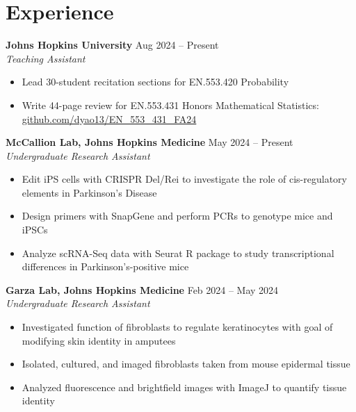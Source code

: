 \documentclass[11pt]{article}       %
\begin{document}
\vspace{-9pt}

\section*{Experience}
\textbf{Johns Hopkins University} \hfill Aug 2024 – Present \\
\textit{Teaching Assistant} \vspace{-9pt} \\
\begin{itemize}
  \item Lead 30-student recitation sections for EN.553.420 Probability
  \item Write 44-page review for EN.553.431 Honors Mathematical Statistics: \href{https://github.com/dyao13/EN\_553\_431\_FA24}{github.com/dyao13/EN\_553\_431\_FA24}
\end{itemize}

\textbf{McCallion Lab, Johns Hopkins Medicine} \hfill May 2024 – Present \\
\textit{Undergraduate Research Assistant} \vspace{-9pt} \\
\begin{itemize}
  \item Edit iPS cells with CRISPR Del/Rei to investigate the role of cis-regulatory elements in Parkinson’s Disease
  \item Design primers with SnapGene and perform PCRs to genotype mice and iPSCs
  \item Analyze scRNA-Seq data with Seurat R package to study transcriptional differences in Parkinson’s-positive mice
\end{itemize}

\textbf{Garza Lab, Johns Hopkins Medicine} \hfill Feb 2024 – May 2024 \\
\textit{Undergraduate Research Assistant} \vspace{-9pt} \\
\begin{itemize}
  \item Investigated function of fibroblasts to regulate keratinocytes with goal of modifying skin identity in amputees
  \item Isolated, cultured, and imaged fibroblasts taken from mouse epidermal tissue
  \item Analyzed fluorescence and brightfield images with ImageJ to quantify tissue identity
\end{itemize}
\end{document}
